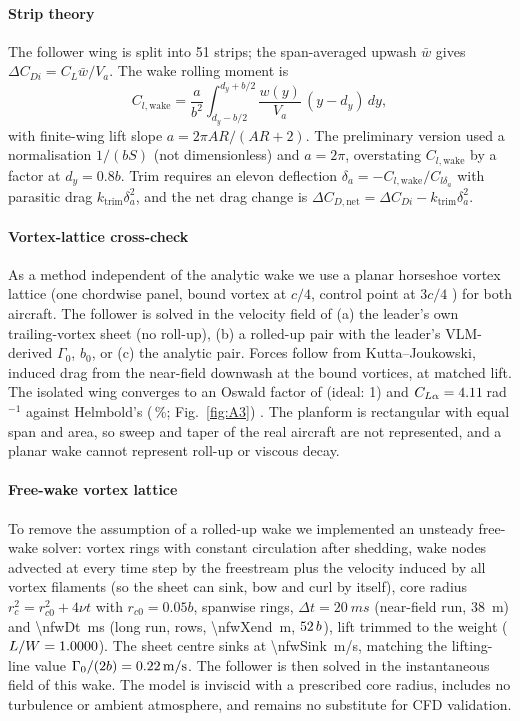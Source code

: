 \documentclass[preprint,12pt]{elsarticle}
\newcommand{\Va}{V_a}
\begin{document}
\paragraph{Strip theory} The follower wing is split into 51 strips; the span-averaged upwash $\bar w$ gives $\Delta C_{Di}=C_L\bar w/\Va$. The wake rolling moment is
\begin{equation}
C_{l,\mathrm{wake}}=\frac{a}{b^2}\int_{d_y-b/2}^{d_y+b/2}\frac{w(y)}{\Va}\,(y-d_y)\,dy,
\end{equation}
with finite-wing lift slope $a=2\pi AR/(AR+2)$. The preliminary version used a normalisation $1/(bS)$ (not dimensionless) and $a=2\pi$, overstating $C_{l,\mathrm{wake}}$ by a factor \nclPubOverCorr{} at $d_y=0.8b$. Trim requires an elevon deflection $\delta_a=-C_{l,\mathrm{wake}}/C_{l\delta_a}$ with parasitic drag $k_{\mathrm{trim}}\delta_a^2$, and the net drag change is $\Delta C_{D,\mathrm{net}}=\Delta C_{Di}-k_{\mathrm{trim}}\delta_a^2$.

\paragraph{Vortex-lattice cross-check}\label{sec:vlm} As a method independent of the analytic wake we use a planar horseshoe vortex lattice (one chordwise panel, bound vortex at $c/4$, control point at $3c/4$ \cite{weissinger1947,katz2001}) for both aircraft. The follower is solved in the velocity field of (a) the leader's own trailing-vortex sheet (no roll-up), (b) a rolled-up pair with the leader's VLM-derived $\Gamma_0$, $b_0$, or (c) the analytic pair. Forces follow from Kutta--Joukowski, induced drag from the near-field downwash at the bound vortices, at matched lift. The isolated wing converges to an Oswald factor of \nvlmE{} (ideal: 1) and $C_{L\alpha}=4.11$\,rad$^{-1}$ against Helmbold's \nhelmCla{} (\nvlmClaErr\,\%; Fig.~\ref{fig:A3}) \cite{anderson2017}. The planform is rectangular with equal span and area, so sweep and taper of the real aircraft are not represented, and a planar wake cannot represent roll-up or viscous decay.

\paragraph{Free-wake vortex lattice} To remove the assumption of a rolled-up wake we implemented an unsteady free-wake solver: vortex rings with constant circulation after shedding, wake nodes advected at every time step by the freestream plus the velocity induced by all vortex filaments (so the sheet can sink, bow and curl by itself), core radius $r_c^2=r_{c0}^2+4\nu t$ with $r_{c0}=0.05b$, \nfwSpan{} spanwise rings, $\Delta t=\SI{20}{ms}$ (near-field run, \SI{38}{m}) and \SI{\nfwDt}{ms} (long run, \nfwRows{} rows, \SI{\nfwXend}{m}, $52\,b$), lift trimmed to the weight ($L/W=1.0000$). The sheet centre sinks at \SI{\nfwSink}{m/s}, matching the lifting-line value $\Gamma_0/(2b)=\SI{0.22}{m/s}$. The follower is then solved in the instantaneous field of this wake. The model is inviscid with a prescribed core radius, includes no turbulence or ambient atmosphere, and remains no substitute for CFD validation.
\end{document}
